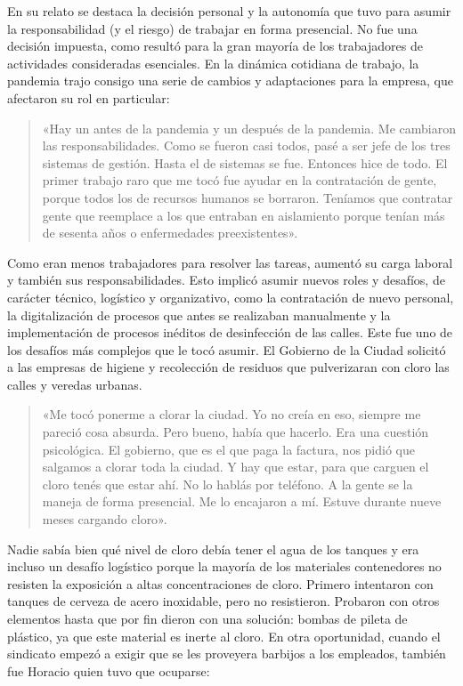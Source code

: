 En su relato se destaca la decisión personal y la autonomía que tuvo para asumir la responsabilidad (y el riesgo) de trabajar en forma presencial. No fue una decisión impuesta, como resultó para la gran mayoría de los trabajadores de actividades consideradas esenciales. En la dinámica cotidiana de trabajo, la pandemia trajo consigo una serie de cambios y adaptaciones para la empresa, que afectaron su rol en particular:

\begin{quote}
«Hay un antes de la pandemia y un después de la pandemia. Me cambiaron las responsabilidades. Como se fueron casi todos, pasé a ser jefe de los tres sistemas de gestión. Hasta el de sistemas se fue. Entonces hice de todo. El primer trabajo raro que me tocó fue ayudar en la contratación de gente, porque todos los de recursos humanos se borraron. Teníamos que contratar gente que reemplace a los que entraban en aislamiento porque tenían más de sesenta años o enfermedades preexistentes».
\end{quote}

Como eran menos trabajadores para resolver las tareas, aumentó su carga laboral y también sus responsabilidades. Esto implicó asumir nuevos roles y desafíos, de carácter técnico, logístico y organizativo, como la contratación de nuevo personal, la digitalización de procesos que antes se realizaban manualmente y la implementación de procesos inéditos de desinfección de las calles. Este fue uno de los desafíos más complejos que le tocó asumir. El Gobierno de la Ciudad solicitó a las empresas de higiene y recolección de residuos que pulverizaran con cloro las calles y veredas urbanas.

\begin{quote}
«Me tocó ponerme a clorar la ciudad. Yo no creía en eso, siempre me pareció cosa absurda. Pero bueno, había que hacerlo. Era una cuestión psicológica. El gobierno, que es el que paga la factura, nos pidió que salgamos a clorar toda la ciudad. Y hay que estar, para que carguen el cloro tenés que estar ahí. No lo hablás por teléfono. A la gente se la maneja de forma presencial. Me lo encajaron a mí. Estuve durante nueve meses cargando cloro».
\end{quote}

Nadie sabía bien qué nivel de cloro debía tener el agua de los tanques y era incluso un desafío logístico porque la mayoría de los materiales contenedores no resisten la exposición a altas concentraciones de cloro. Primero intentaron con tanques de cerveza de acero inoxidable, pero no resistieron. Probaron con otros elementos hasta que por fin dieron con una solución: bombas de pileta de plástico, ya que este material es inerte al cloro. En otra oportunidad, cuando el sindicato empezó a exigir que se les proveyera barbijos a los empleados, también fue Horacio quien tuvo que ocuparse:

